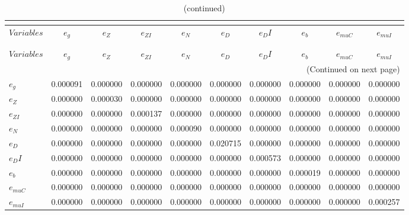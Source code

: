  
\begin{center}
\begin{longtable}{lccccccccc} 
\caption{MATRIX OF COVARIANCE OF EXOGENOUS SHOCKS}\\
 \label{Table:covar_ex_shocks}\\
\toprule 
$Variables  $	 & 	 $        {e_g}$	 & 	 $        {e_Z}$	 & 	 $     {e_{ZI}}$	 & 	 $        {e_N}$	 & 	 $        {e_D}$	 & 	 $       {e_DI}$	 & 	 $        {e_b}$	 & 	 $    {e_{muC}}$	 & 	 $    {e_{muI}}$\\
\midrule \endfirsthead 
\caption{(continued)}\\
 \toprule \\ 
$Variables  $	 & 	 $        {e_g}$	 & 	 $        {e_Z}$	 & 	 $     {e_{ZI}}$	 & 	 $        {e_N}$	 & 	 $        {e_D}$	 & 	 $       {e_DI}$	 & 	 $        {e_b}$	 & 	 $    {e_{muC}}$	 & 	 $    {e_{muI}}$\\
\midrule \endhead 
\midrule \multicolumn{10}{r}{(Continued on next page)} \\ \bottomrule \endfoot 
\bottomrule \endlastfoot 
${e_g}      $	 & 	     0.000091	 & 	     0.000000	 & 	     0.000000	 & 	     0.000000	 & 	     0.000000	 & 	     0.000000	 & 	     0.000000	 & 	     0.000000	 & 	     0.000000 \\ 
${e_Z}      $	 & 	     0.000000	 & 	     0.000030	 & 	     0.000000	 & 	     0.000000	 & 	     0.000000	 & 	     0.000000	 & 	     0.000000	 & 	     0.000000	 & 	     0.000000 \\ 
${e_{ZI}}   $	 & 	     0.000000	 & 	     0.000000	 & 	     0.000137	 & 	     0.000000	 & 	     0.000000	 & 	     0.000000	 & 	     0.000000	 & 	     0.000000	 & 	     0.000000 \\ 
${e_N}      $	 & 	     0.000000	 & 	     0.000000	 & 	     0.000000	 & 	     0.000090	 & 	     0.000000	 & 	     0.000000	 & 	     0.000000	 & 	     0.000000	 & 	     0.000000 \\ 
${e_D}      $	 & 	     0.000000	 & 	     0.000000	 & 	     0.000000	 & 	     0.000000	 & 	     0.020715	 & 	     0.000000	 & 	     0.000000	 & 	     0.000000	 & 	     0.000000 \\ 
${e_DI}     $	 & 	     0.000000	 & 	     0.000000	 & 	     0.000000	 & 	     0.000000	 & 	     0.000000	 & 	     0.000573	 & 	     0.000000	 & 	     0.000000	 & 	     0.000000 \\ 
${e_b}      $	 & 	     0.000000	 & 	     0.000000	 & 	     0.000000	 & 	     0.000000	 & 	     0.000000	 & 	     0.000000	 & 	     0.000019	 & 	     0.000000	 & 	     0.000000 \\ 
${e_{muC}}  $	 & 	     0.000000	 & 	     0.000000	 & 	     0.000000	 & 	     0.000000	 & 	     0.000000	 & 	     0.000000	 & 	     0.000000	 & 	     0.000000	 & 	     0.000000 \\ 
${e_{muI}}  $	 & 	     0.000000	 & 	     0.000000	 & 	     0.000000	 & 	     0.000000	 & 	     0.000000	 & 	     0.000000	 & 	     0.000000	 & 	     0.000000	 & 	     0.000257 \\ 
\end{longtable}
 \end{center}
